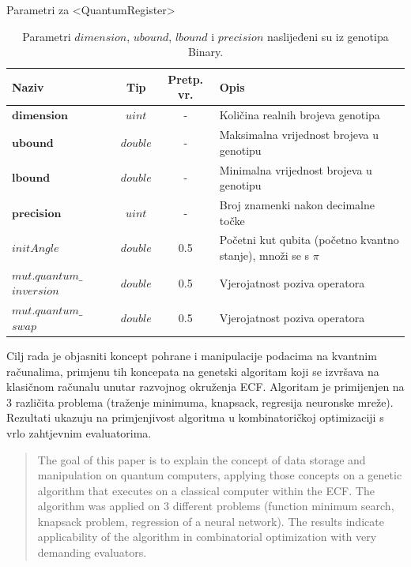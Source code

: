 \documentclass[times, utf8, zavrsni, numeric]{fer}
\begin{document}
\begin{table}[htb]
\caption{Parametri za <QuantumRegister>}
\label{tbl:param_kvareg}
\centering
\caption*{\footnotesize Parametri $dimension$, $ubound$, $lbound$ i $precision$ naslijeđeni su iz genotipa Binary.}
\begin{tabular}{p{3cm}ccp{7cm}} \hline
Naziv & Tip & Pretp. vr. & Opis\\ \toprule
$\textbf{dimension}$ & $uint$ & - & Količina realnih brojeva genotipa \\
$\textbf{ubound}$ & $double$ & - & Maksimalna vrijednost brojeva u genotipu \\
$\textbf{lbound}$ & $double$ & - & Minimalna vrijednost brojeva u genotipu \\
$\textbf{precision}$ & $uint$ & - & Broj znamenki nakon decimalne točke \\
$initAngle$ & $double$ & 0.5 & Početni kut qubita (početno kvantno stanje), množi se s $\pi$ \\
$mut.quantum\_$ $inversion$ & $double$ & 0.5 & Vjerojatnost poziva operatora \\
$mut.quantum\_$ $swap$ & $double$ & 0.5 & Vjerojatnost poziva operatora \\ \bottomrule
\end{tabular}
\end{table}

\clearpage

\begin{sazetak}
Cilj rada je objasniti koncept pohrane i manipulacije podacima na kvantnim računalima, primjenu tih koncepata na genetski algoritam koji se izvršava na klasičnom računalu unutar razvojnog okruženja ECF. Algoritam je primijenjen na 3 različita problema (traženje minimuma, knapsack, regresija neuronske mreže). Rezultati ukazuju na primjenjivost algoritma u kombinatoričkoj optimizaciji s vrlo zahtjevnim evaluatorima.

\end{sazetak}

\begin{abstract}
The goal of this paper is to explain the concept of data storage and manipulation on quantum computers, applying those concepts on a genetic algorithm that executes on a classical computer within the ECF. The algorithm was applied on 3 different problems (function minimum search, knapsack problem, regression of a neural network). The results indicate applicability of the algorithm in combinatorial optimization with very demanding evaluators.

\end{abstract}
\end{document}
